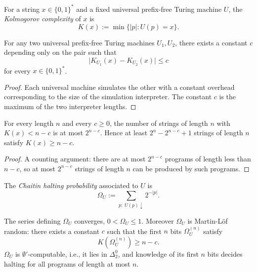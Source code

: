 \begin{definition}\label{def-kolmogorov}
For a string $x \in \{0,1\}^*$ and a fixed universal prefix-free Turing machine $U$, the \emph{Kolmogorov complexity} of $x$ is
\[
K(x) := \min\bigl\{|p| : U(p) = x\bigr\}.
\]
\end{definition}

\begin{theorem}\label{thm-invariance}
For any two universal prefix-free Turing machines $U_1, U_2$, there exists a constant $c$ depending only on the pair such that
\[
\bigl| K_{U_1}(x) - K_{U_2}(x) \bigr| \le c
\]
for every $x \in \{0,1\}^*$.
\end{theorem}

\begin{proof}
Each universal machine simulates the other with a constant overhead corresponding to the size of the simulation interpreter. The constant $c$ is the maximum of the two interpreter lengths.
\end{proof}

\begin{theorem}[Incompressibility]\label{thm-incompressibility}
For every length $n$ and every $c \ge 0$, the number of strings of length $n$ with $K(x) < n - c$ is at most $2^{n-c}$. Hence at least $2^n - 2^{n-c} + 1$ strings of length $n$ satisfy $K(x) \ge n - c$.
\end{theorem}

\begin{proof}
A counting argument: there are at most $2^{n-c}$ programs of length less than $n - c$, so at most $2^{n-c}$ strings of length $n$ can be produced by such programs.
\end{proof}

\begin{definition}\label{def-chaitin-omega}
The \emph{Chaitin halting probability} associated to $U$ is
\[
\Omega_U := \sum_{p:\; U(p)\downarrow} 2^{-|p|}.
\]
\end{definition}

\begin{theorem}\label{thm-omega-properties}
The series defining $\Omega_U$ converges, $0 < \Omega_U \le 1$. Moreover $\Omega_U$ is Martin-L\"of random: there exists a constant $c$ such that the first $n$ bits $\Omega_U^{(n)}$ satisfy
\[
K(\Omega_U^{(n)}) \ge n - c.
\]
$\Omega_U$ is $\emptyset'$-computable, i.e., it lies in $\Delta^0_2$, and knowledge of its first $n$ bits decides halting for all programs of length at most $n$.
\end{theorem}

